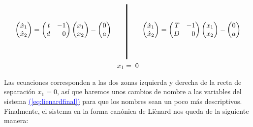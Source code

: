 \documentclass[12pt,a4paper]{report} %
\newcommand{\eref}[1]{\hyperref[#1]{\textcolor{blue}{(\ref*{#1})}}}
\newcommand{\eref}[1]{\hyperref[#1]{\textcolor{blue}{\textit{(\ref*{#1})}}}}
\begin{document}
	\begin{equation}
		\label{eq:lienardfinalgr}
		\begin{gathered}
			\begin{pmatrix*}[r]
				\dot{x}_1\\ \dot{x}_2
			\end{pmatrix*}= \begin{pmatrix*}[r]
				t & -1 \\ d & 0
			\end{pmatrix*} \begin{pmatrix*}[r]
				x_1 \\ x_2
			\end{pmatrix*}-\begin{pmatrix*}[c]
				0 \\ a
			\end{pmatrix*} \qquad 
			\rule[-40pt]{1.5pt}{80pt} \qquad 
			\begin{pmatrix*}[r]
				\dot{x}_1\\ \dot{x}_2
			\end{pmatrix*}= \begin{pmatrix*}[r]
				T & -1 \\ D & 0
			\end{pmatrix*} \begin{pmatrix*}[r]
				x_1 \\ x_2
			\end{pmatrix*}-\begin{pmatrix*}[c]
				0 \\ a
			\end{pmatrix*} \\ x_1=\;0
		\end{gathered}
	\end{equation}\smallskip
	
	\newpage
	
	\noindent Las ecuaciones corresponden a las dos zonas izquierda y derecha de la recta de separación $x_1=0$, así que haremos unos cambios de nombre a las variables del sistema \eref{eq:lienardfinal} para que los nombres sean un poco más descriptivos. Finalmente, el sistema en la forma canónica de Liènard nos queda de la siguiente manera:
	
\end{document}
